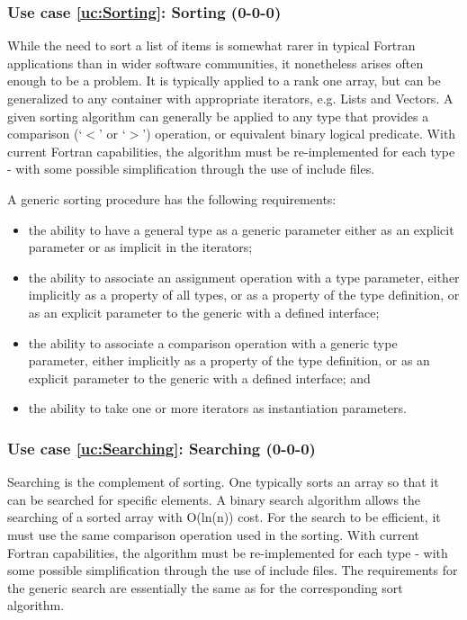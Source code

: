 \documentclass{article}
\newcounter{usecase}
\newcounter{requirement}
\newcommand{\newusecase}[2]{
\refstepcounter{usecase}\label{uc:#1}
\subsubsection{Use case \ref{uc:#1}: #1 (#2)}}
\begin{document}
\newusecase{Sorting}{0-0-0}

While the need to sort a list of items is somewhat rarer in typical
Fortran applications than in wider software communities, it
nonetheless arises often enough to be a problem.   It is typically
applied to a rank one array, but can be generalized to any container
with appropriate iterators, e.g. Lists and Vectors.  A given sorting
algorithm can generally be applied to any type that provides a
comparison (`$<$' or `$>$') operation, or equivalent binary logical
predicate.   With current Fortran
capabilities, the algorithm must be re-implemented for each type -
with some possible simplification through the use of include files.

A generic sorting procedure has the following requirements:
\begin{itemize}
\item the ability to have a general type as a generic parameter
  either as an explicit parameter or as implicit in the iterators;

\item the ability to associate an assignment operation with a type
  parameter, either implicitly as a property of all types, or
  as a property of the type definition, or as an explicit parameter to
  the generic with a defined interface;

\item the ability to associate a comparison operation with a generic
  type parameter, either implicitly
  as a property of the type definition, or as an explicit parameter to
  the generic with a defined interface; and

\item the ability to take one or more iterators as instantiation
  parameters.

\end{itemize}

\newusecase{Searching}{0-0-0}

Searching is the  complement of sorting. One typically sorts an array
so that it can be searched for specific elements. A binary search
algorithm allows the searching of a sorted array with O(ln(n)) cost.
For the search to be efficient, it must use the same comparison
operation used in the sorting.  With current Fortran
capabilities, the algorithm must be re-implemented for each type -
with some possible simplification through the use of include
files. The requirements for the generic search are essentially the
same as for the corresponding sort algorithm.
\end{document}
